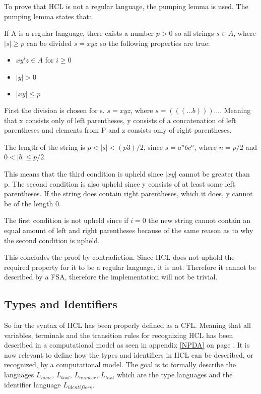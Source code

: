 To prove that HCL is not a regular language, the pumping lemma is used.
The pumping lemma states that:
\begin{center}
	If A is a regular language, there exists a number $p>0$ so all strings $s \in A $, where $|s| \geq p$ can be divided $s = xyz$ so the following properties are true:
	\begin{itemize}
		\item $xy^iz \in A$ for $i \geq 0$
		\item $|y| > 0$
		\item $|xy| \leq p$
	\end{itemize}
\end{center}

First the division is chosen for s.
$s = xyz$, where $s = (((...b)))...$.
Meaning that x consists only of left parentheses, y consists of a concatenation of left parentheses and elements from P and z consists only of right parentheses.

The length of the string is $p < |s| < (p3)/2$, since $s = a^nbc^n$, where $n = p/2$ and $0 < |b| \leq p/2$.

This means that the third condition is upheld since $|xy|$ cannot be greater than p.
The second condition is also upheld since y consists of at least some left parentheses. 
If the string does contain right parentheses, which it does, y cannot be of the length 0.

The first condition is not upheld since if $i = 0$ the new string cannot contain an equal amount of left and right parentheses because of the same reason as to why the second condition is upheld.

This concludes the proof by contradiction.
Since HCL does not uphold the required property for it to be a regular language, it is not.
Therefore it cannot be described by a FSA, therefore the implementation will not be trivial.

\subsection{Types and Identifiers}
So far the syntax of HCL has been properly defined as a CFL. 
Meaning that all variables, terminals and the transition rules for recognizing HCL has been described in a computational model as seen in appendix \ref{NPDA} on page \pageref{NPDA}.
It is now relevant to define how the types and identifiers in HCL can be described, or recognized, by a computational model.
The goal is to formally describe the languages $L_{none}$, $L_{bool}$, $L_{number}$, $L_{text}$ which are the type languages and the identifier language $L_{identifiers}$.

